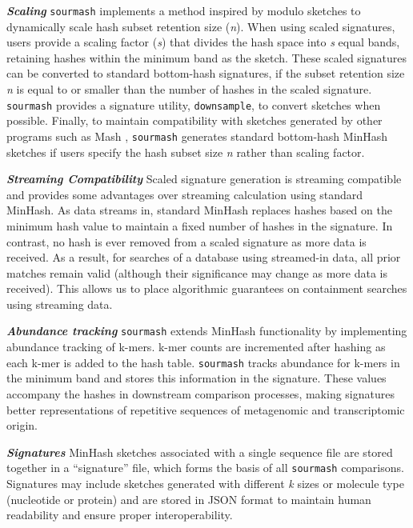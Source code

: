 \documentclass[10pt,a4paper,twocolumn]{article}
\begin{document}
\textit{\textbf{Scaling}} \lstinline{sourmash} implements a method inspired by modulo sketches \cite{broder1997resemblance} to dynamically scale hash subset retention size (\textit{n}). When using scaled signatures, users provide  a scaling factor (\textit{s}) that divides the hash space into \textit{s} equal bands, retaining hashes within the minimum band as the sketch. These scaled signatures can be converted to standard bottom-hash signatures, if the subset retention size \textit{n} is equal to or smaller than the number of hashes in the scaled signature. \lstinline{sourmash} provides a signature utility, \lstinline{downsample}, to convert sketches when possible. Finally, to maintain compatibility with sketches generated by other programs such as Mash \cite{ondov2016mash}, \lstinline{sourmash} generates standard bottom-hash MinHash sketches if users specify the hash subset size \textit{n} rather than scaling factor.


\textit{\textbf{Streaming Compatibility}} Scaled signature generation is streaming compatible and provides some advantages over streaming calculation using standard MinHash. As data streams in, standard MinHash replaces hashes based on the minimum hash value to maintain a fixed number of hashes in the signature. In contrast, no hash is ever removed from a scaled signature as more data is received. As a result, for searches of a database using streamed-in data, all prior matches remain valid (although their significance may change as more data is received). This allows us to place algorithmic guarantees on containment searches using streaming data.


\textit{\textbf{Abundance tracking}} \lstinline{sourmash} extends MinHash functionality by implementing abundance tracking of k-mers. k-mer counts are incremented after hashing as each k-mer is added to the hash table. \lstinline{sourmash} tracks abundance for k-mers in the minimum band and stores this information in the signature. These values accompany the hashes in downstream comparison processes, making signatures better representations of repetitive sequences of metagenomic and transcriptomic origin. 

 
\textit{\textbf{Signatures}} MinHash sketches associated with a single sequence file are stored together in a “signature” file, which forms the basis of all \lstinline{sourmash} comparisons. Signatures may include sketches generated with different \textit{k} sizes or molecule type (nucleotide or protein) and are stored in JSON format to maintain human readability and ensure proper interoperability. 
\end{document}
